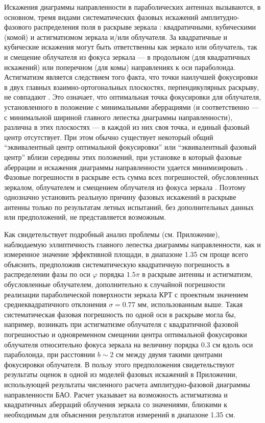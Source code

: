 Искажения диаграммы направленности в параболических антеннах вызываются, в основном, тремя видами
систематических фазовых искажений амплитудно-фазового распределения поля в раскрыве зеркала
\cite{Hansen_1966,Ajzenberg_1977,Christiansen_1972,Galimov_2010}: квадратичными, кубическими (комой)
и астигматизмом зеркала и/или облучателя. За квадратичные и кубические искажения могут быть
ответственны как зеркало или облучатель, так и смещение облучателя из фокуса зеркала --- в
продольном (для квадратичных искажений) или поперечном (для комы) направлениях к оси параболоида.
Астигматизм является следствием того факта, что точки наилучшей фокусировки в двух главных
взаимно-ортогональных плоскостях, перпендикулярных раскрыву, не совпадают \cite{Hansen_1966}. Это
означает, что оптимальная точка фокусировки для облучателя, установленного в положение с
минимальными аберрациями (и соответственно --- с минимальной шириной главного лепестка диаграммы
направленности), различна в этих плоскостях --- в каждой из них своя точка, и единый фазовый центр
отсутствует. При этом обычно существует некоторый общий ``эквивалентный центр оптимальной
фокусировки'' или ``эквивалентный фазовый центр'' вблизи середины этих положений, при установке в
который фазовые аберрации и искажения диаграммы направленности удается минимизировать
\cite{Hansen_1966,Galimov_2010}. Фазовые погрешности в раскрыве есть сумма всех погрешностей,
обусловленных зеркалом, облучателем и смещением облучателя из фокуса зеркала
\cite{Shubarin_1960,Cejtlin_1976}. Поэтому однозначно установить реальную причину фазовых искажений
в раскрыве антенны только по результатам летных испытаний, без дополнительных данных или
предположений, не представляется возможным.

Как свидетельствует подробный анализ проблемы (см. Приложение), наблюдаемую эллиптичность главного
лепестка диаграммы направленности, как и измеренное значение эффективной площади, в диапазоне 1.35
см проще всего объяснить, предположив систематическую квадратичную погрешность в распределении фазы
по оси $\varphi$ порядка $1.5 \pi$ в раскрыве антенны и астигматизм, обусловленные облучателем,
дополнительно к случайной погрешности реализации параболической поверхности зеркала КРТ с проектным
значением среднеквадратичного отклонения $\sigma = 0.77$ мм, использованным выше. Такая
систематическая фазовая погрешность по одной оси в раскрыве могла бы, например, возникать при
астигматизме облучателя с квадратичной фазовой погрешностью и одновременном смещении центра
оптимальной фокусировки облучателя относительно фокуса зеркала на величину порядка 0.3 см вдоль оси
параболоида, при расстоянии $b \sim 2$ см между двумя такими центрами фокусировки облучателя. В
пользу этого предположения свидетельствуют результаты оценок в одной из моделей фазовых искажений в
Приложении, использующей результаты численного расчета \cite{}  амплитудно-фазовой диаграммы
направленности БАО. Расчет \cite{} указывает на возможность астигматизма и квадратичных аберраций
облучения зеркала со значениями, близкими к необходимым для объяснения результатов измерений в
диапазоне 1.35 см.

